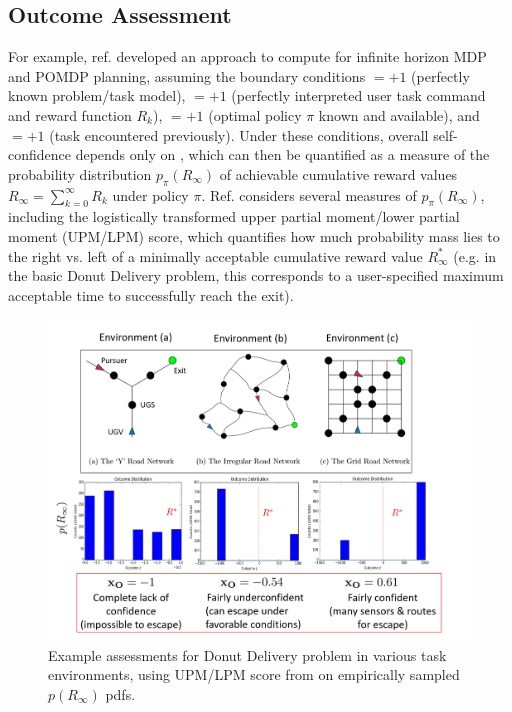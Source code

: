 \subsection{Outcome Assessment} \label{sec:OA}
    For example, ref. \cite{Aitken2016-cv} developed an approach to compute \xO{} for infinite horizon MDP and POMDP planning, assuming the boundary conditions \xM$=+1$ (perfectly known problem/task model), \xI $= +1$ (perfectly interpreted user task command and reward function $R_k$), \xQ$=+1$ (optimal policy $\pi$ known and available), and \xP$=+1$ (task encountered previously). Under these conditions, overall self-confidence depends only on \xO, which can then be quantified as a measure of the probability distribution $p_{\pi}(R_{\infty})$ of achievable cumulative reward values $R_{\infty} = \sum_{k=0}^{\infty}R_{k}$ under policy $\pi$. Ref. \cite{Aitken2016-cv} considers several measures of $p_{\pi}(R_{\infty})$, including the logistically transformed upper partial moment/lower partial moment (UPM/LPM) score, which quantifies how much probability mass lies to the right vs. left of a minimally acceptable cumulative reward value $R^*_{\infty}$ (e.g. in the basic Donut Delivery problem, this corresponds to a user-specified maximum acceptable time to successfully reach the exit).

    \begin{figure}[tbp]
        \centering
        \includegraphics[width=0.90\linewidth]{Figures/xO_envsOnly.png}
        \caption{Example \xO{} assessments for Donut Delivery problem in various task environments, using UPM/LPM score from \cite{Aitken2016-cv} on empirically sampled $p(R_{\infty})$ pdfs.}
        \label{fig:xOexample}
    \end{figure}


